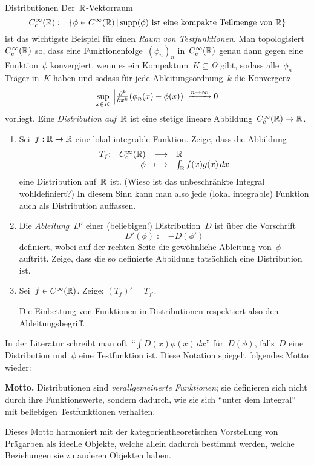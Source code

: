 \documentclass{pizzablatt}
\begin{document}

\begin{aufgabe}{Distributionen}
Der~$\mathbb{R}$-Vektorraum
\[ C^\infty_c(\mathbb{R}) := \{ \phi \in C^\infty(\mathbb{R}) \,|\,
  \text{$\operatorname{supp}(\phi)$ ist eine kompakte Teilmenge von~$\mathbb{R}$}
  \} \]
ist das wichtigste Beispiel für einen \emph{Raum von Testfunktionen}. Man
topologisiert~$C^\infty_c(\mathbb{R})$ so, dass eine Funktionenfolge~$(\phi_n)_n$
in~$C^\infty_c(\mathbb{R})$ genau dann gegen eine Funktion~$\phi$ konvergiert, wenn
es ein Kompaktum~$K \subseteq \Omega$ gibt, sodass alle~$\phi_n$ Träger in~$K$
haben und sodass für jede Ableitungsordnung~$k$ die Konvergenz
\[ \sup_{x \in K}\ \Bigl|\tfrac{\partial^k}{\partial x^k} (\phi_n(x) -
\phi(x))\Bigr| \xrightarrow{n \to \infty} 0 \]
vorliegt. Eine \emph{Distribution auf~$\mathbb{R}$} ist eine stetige lineare
Abbildung~$C^\infty_c(\mathbb{R}) \to \mathbb{R}$.

\begin{enumerate}
\item Sei~$f : \mathbb{R} \to \mathbb{R}$ eine lokal integrable Funktion. Zeige, dass die Abbildung
\[ \begin{array}{@{}rrcl@{}}
  T_f{:} & C^\infty_c(\RR) &\longrightarrow& \RR \\
  & \phi &\longmapsto& \int_\RR f(x) g(x) \,dx
\end{array} \]
eine Distribution auf~$\mathbb{R}$ ist. (Wieso ist das unbeschränkte Integral
wohldefiniert?) In diesem Sinn kann man also jede (lokal integrable) Funktion
auch als Distribution auffassen.
\item Die \emph{Ableitung~$D'$} einer (beliebigen!) Distribution~$D$ ist über die Vorschrift
\[ D'(\phi) := -D(\phi') \]
definiert, wobei auf der rechten Seite die gewöhnliche Ableitung von~$\phi$
auftritt. Zeige, dass die so definierte Abbildung tatsächlich eine Distribution
ist.
\item Sei~$f \in C^\infty(\mathbb{R})$. Zeige: $(T_f)' = T_{f'}$.

Die Einbettung von Funktionen in Distributionen respektiert also den
Ableitungsbegriff.
\end{enumerate}

In der Literatur schreibt man oft~"`$\int D(x) \phi(x)
\,dx$"' für~$D(\phi)$, falls~$D$ eine Distribution und~$\phi$ eine Testfunktion
ist. Diese Notation spiegelt folgendes Motto wieder:

\textbf{Motto.} Distributionen sind \emph{verallgemeinerte Funktionen}; sie
definieren sich nicht durch ihre Funktionswerte, sondern dadurch, wie sie sich
"`unter dem Integral"' mit beliebigen Testfunktionen verhalten.

Dieses Motto harmoniert mit der kategorientheoretischen Vorstellung von
Prägarben als ideelle Objekte, welche allein dadurch bestimmt werden, welche Beziehungen sie zu
anderen Objekten haben.
\end{aufgabe}
\end{document}
